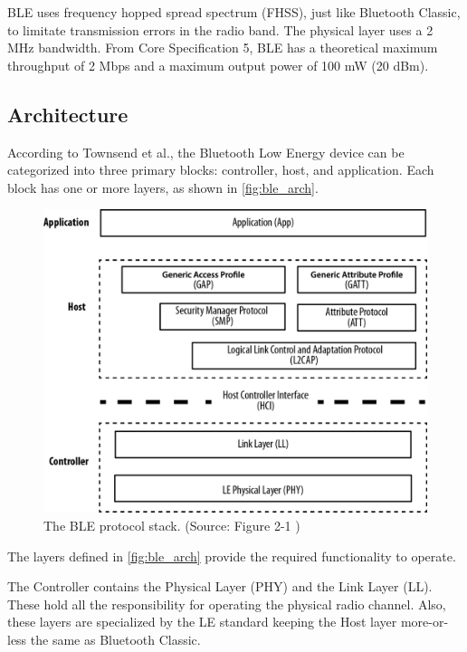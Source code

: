 BLE uses frequency hopped spread spectrum (FHSS), just like Bluetooth Classic,
to limitate transmission errors in the radio band.
The physical layer uses a 2 MHz bandwidth.
From Core Specification 5, BLE has a theoretical maximum throughput of 2 Mbps and
a maximum output power of 100 mW (20 dBm).

\subsection{Architecture}
\label{ble:ow}

According to Townsend et al., the Bluetooth Low Energy device can be categorized into
three primary blocks: controller, host, and application.
Each block has one or more layers, as shown in \autoref{fig:ble_arch}.

\begin{figure}[!ht]
    \centering
    \includegraphics[width=150mm, keepaspectratio]{figures/ble_arch_from_townsend.png}
    \caption{The BLE protocol stack. (Source: Figure 2-1 \cite{Townsend14})}
    \label{fig:ble_arch}
\end{figure}

The layers defined in \autoref{fig:ble_arch} provide the required functionality to operate.

The Controller contains the Physical Layer (PHY) and the Link Layer (LL).
These hold all the responsibility for operating the physical radio channel.
Also, these layers are specialized by the LE standard keeping the Host
layer more-or-less the same as Bluetooth Classic.

